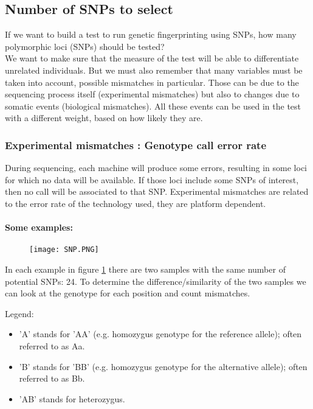 \subsection{Number of SNPs to select}

If we want to build a test to run genetic fingerprinting using SNPs, how many polymorphic loci (SNPs) should be tested?\\
We want to make sure that the measure of the test will be able to differentiate unrelated individuals.
But we must also remember that many variables must be taken into account, possible mismatches in particular. Those can be due to the sequencing process itself (experimental mismatches) but also to changes due to somatic events (biological mismatches). All these events can be used in the test with a different weight, based on how likely they are.


\subsubsection{Experimental mismatches : Genotype call error rate}

During sequencing, each machine will produce some errors, resulting in some loci for which no data will be available. If those loci include some SNPs of interest, then no call will be associated to that SNP.
Experimental mismatches are related to the error rate of the technology used, they are platform dependent.

\paragraph*{Some examples:}

\begin{figure}[H]
	\centering
	\texttt{[image: SNP.PNG]}
	\caption{}
	\label{fig:SNP}
\end{figure}

In each example in figure \ref{fig:SNP} there are two samples with the same number of potential SNPs: 24. To determine the difference/similarity of the two samples we can look at the genotype for each position and count mismatches.

Legend: \\
\begin{itemize}
\item 'A' stands for 'AA' (e.g. homozygus genotype for the reference allele); often referred to as Aa.
\item 'B' stands for 'BB' (e.g. homozygus genotype for the alternative allele); often referred to as Bb.
\item 'AB' stands for heterozygus.
\end{itemize}

